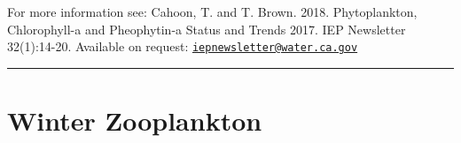 \documentclass[
]{book}
\begin{document}
\begin{disclaimer}
For more information see: Cahoon, T. and T. Brown. 2018. Phytoplankton,
Chlorophyll-a and Pheophytin-a Status and Trends 2017. IEP Newsletter
32(1):14-20. Available on request:
\href{mailto:iepnewsletter@water.ca.gov}{\nolinkurl{iepnewsletter@water.ca.gov}}
\end{disclaimer}

\begin{center}\rule{0.5\linewidth}{0.5pt}\end{center}

\hypertarget{winter-zooplankton}{%
\section{Winter Zooplankton}\label{winter-zooplankton}}
\end{document}
